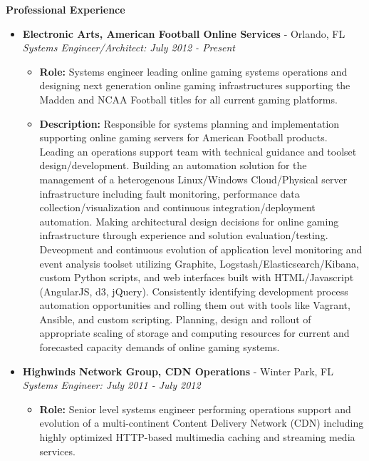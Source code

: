 \documentclass[10pt,oneside]{article}
\newenvironment{ressection}[1]{
  \vspace{4pt}
  \textbf{\selectfont\normalsize#1}
  \begin{itemize}
  \vspace{3pt}
}{
  \end{itemize}
}
\newcommand{\ressubitem}[1]{
  \vspace{-1pt}
  \item \begin{flushleft} #1 \end{flushleft}
}
\newcommand{\resbigitem}[3]{
  \vspace{-5pt}
  \item
  \textbf{#1} - #2 \\
  \textit{#3}
}
\newenvironment{ressubsec}[3]{
  \resbigitem{#1}{#2}{#3}
  \vspace{-2pt}
  \begin{itemize}
}{
  \end{itemize}
}
\begin{document}

\begin{ressection}{Professional Experience}

  \begin{ressubsec}{Electronic Arts, American Football Online Services}{Orlando, FL}{Systems Engineer/Architect: July 2012 - Present}

    \ressubitem{\textbf{Role:} Systems engineer leading online gaming systems operations and designing next generation online gaming infrastructures supporting the Madden and NCAA Football titles for all current gaming platforms.}

    \ressubitem{\textbf{Description:} Responsible for systems planning and implementation supporting online gaming servers for American Football products. Leading an operations support team with technical guidance and toolset design/development. Building an automation solution for the management of a heterogenous Linux/Windows Cloud/Physical server infrastructure including fault monitoring, performance data collection/visualization and continuous integration/deployment automation. Making architectural design decisions for online gaming infrastructure through experience and solution evaluation/testing. Deveopment and continuous evolution of application level monitoring and event analysis toolset utilizing Graphite, Logstash/Elasticsearch/Kibana, custom Python scripts, and web interfaces built with HTML/Javascript (AngularJS, d3, jQuery). Consistently identifying development process automation opportunities and rolling them out with tools like Vagrant, Ansible, and custom scripting. Planning, design and rollout of appropriate scaling of storage and computing resources for current and forecasted capacity demands of online gaming systems.}

  \end{ressubsec}
  
  \begin{ressubsec}{Highwinds Network Group, CDN Operations}{Winter Park, FL}{Systems Engineer: July 2011 - July 2012}

    \ressubitem{\textbf{Role:} Senior level systems engineer performing operations support and evolution of a multi-continent Content Delivery Network (CDN) including highly optimized HTTP-based multimedia caching and streaming media services.}


\end{ressubsec}
\end{ressection}
\end{document}
